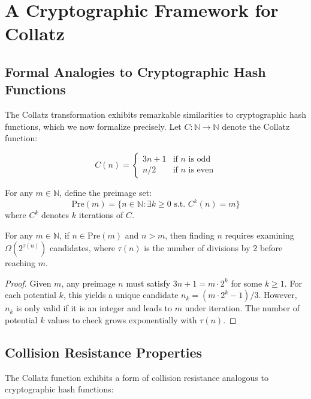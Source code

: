 \section{A Cryptographic Framework for Collatz}

\subsection{Formal Analogies to Cryptographic Hash Functions}

The Collatz transformation exhibits remarkable similarities to cryptographic hash functions, which we now formalize precisely. Let $C: \mathbb{N} \to \mathbb{N}$ denote the Collatz function:

\[
C(n) = \begin{cases}
    3n + 1 & \text{if } n \text{ is odd} \\
    n/2 & \text{if } n \text{ is even}
\end{cases}
\]

\begin{definition}
For any $m \in \mathbb{N}$, define the preimage set:
\[
\text{Pre}(m) = \{n \in \mathbb{N} : \exists k \geq 0 \text{ s.t. } C^k(n) = m\}
\]
where $C^k$ denotes $k$ iterations of $C$.
\end{definition}

\begin{theorem}
For any $m \in \mathbb{N}$, if $n \in \text{Pre}(m)$ and $n > m$, then finding $n$ requires examining $\Omega(2^{\tau(n)})$ candidates, where $\tau(n)$ is the number of divisions by 2 before reaching $m$.
\end{theorem}

\begin{proof}
Given $m$, any preimage $n$ must satisfy $3n + 1 = m \cdot 2^k$ for some $k \geq 1$. For each potential $k$, this yields a unique candidate $n_k = (m \cdot 2^k - 1)/3$. However, $n_k$ is only valid if it is an integer and leads to $m$ under iteration. The number of potential $k$ values to check grows exponentially with $\tau(n)$.
\end{proof}

\subsection{Collision Resistance Properties}

The Collatz function exhibits a form of collision resistance analogous to cryptographic hash functions:

